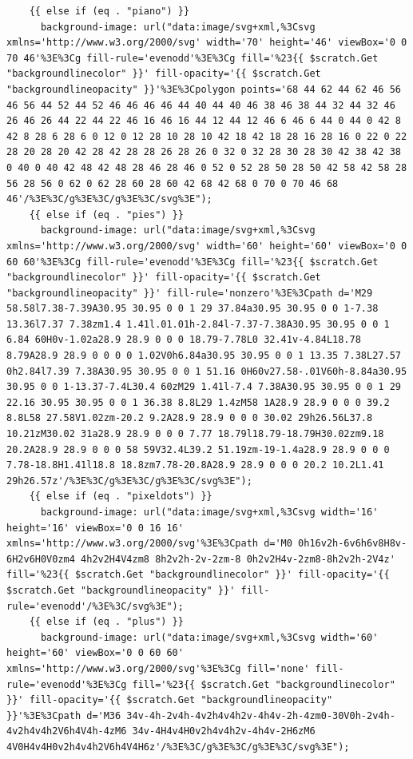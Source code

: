 \documentclass[11pt]{article}
\begin{document}
\begin{enumerate}
\begin{verbatim}
    {{ else if (eq . "piano") }}
      background-image: url("data:image/svg+xml,%3Csvg xmlns='http://www.w3.org/2000/svg' width='70' height='46' viewBox='0 0 70 46'%3E%3Cg fill-rule='evenodd'%3E%3Cg fill='%23{{ $scratch.Get "backgroundlinecolor" }}' fill-opacity='{{ $scratch.Get "backgroundlineopacity" }}'%3E%3Cpolygon points='68 44 62 44 62 46 56 46 56 44 52 44 52 46 46 46 46 44 40 44 40 46 38 46 38 44 32 44 32 46 26 46 26 44 22 44 22 46 16 46 16 44 12 44 12 46 6 46 6 44 0 44 0 42 8 42 8 28 6 28 6 0 12 0 12 28 10 28 10 42 18 42 18 28 16 28 16 0 22 0 22 28 20 28 20 42 28 42 28 28 26 28 26 0 32 0 32 28 30 28 30 42 38 42 38 0 40 0 40 42 48 42 48 28 46 28 46 0 52 0 52 28 50 28 50 42 58 42 58 28 56 28 56 0 62 0 62 28 60 28 60 42 68 42 68 0 70 0 70 46 68 46'/%3E%3C/g%3E%3C/g%3E%3C/svg%3E");
    {{ else if (eq . "pies") }}
      background-image: url("data:image/svg+xml,%3Csvg xmlns='http://www.w3.org/2000/svg' width='60' height='60' viewBox='0 0 60 60'%3E%3Cg fill-rule='evenodd'%3E%3Cg fill='%23{{ $scratch.Get "backgroundlinecolor" }}' fill-opacity='{{ $scratch.Get "backgroundlineopacity" }}' fill-rule='nonzero'%3E%3Cpath d='M29 58.58l7.38-7.39A30.95 30.95 0 0 1 29 37.84a30.95 30.95 0 0 1-7.38 13.36l7.37 7.38zm1.4 1.41l.01.01h-2.84l-7.37-7.38A30.95 30.95 0 0 1 6.84 60H0v-1.02a28.9 28.9 0 0 0 18.79-7.78L0 32.41v-4.84L18.78 8.79A28.9 28.9 0 0 0 0 1.02V0h6.84a30.95 30.95 0 0 1 13.35 7.38L27.57 0h2.84l7.39 7.38A30.95 30.95 0 0 1 51.16 0H60v27.58-.01V60h-8.84a30.95 30.95 0 0 1-13.37-7.4L30.4 60zM29 1.41l-7.4 7.38A30.95 30.95 0 0 1 29 22.16 30.95 30.95 0 0 1 36.38 8.8L29 1.4zM58 1A28.9 28.9 0 0 0 39.2 8.8L58 27.58V1.02zm-20.2 9.2A28.9 28.9 0 0 0 30.02 29h26.56L37.8 10.21zM30.02 31a28.9 28.9 0 0 0 7.77 18.79l18.79-18.79H30.02zm9.18 20.2A28.9 28.9 0 0 0 58 59V32.4L39.2 51.19zm-19-1.4a28.9 28.9 0 0 0 7.78-18.8H1.41l18.8 18.8zm7.78-20.8A28.9 28.9 0 0 0 20.2 10.2L1.41 29h26.57z'/%3E%3C/g%3E%3C/g%3E%3C/svg%3E");
    {{ else if (eq . "pixeldots") }}
      background-image: url("data:image/svg+xml,%3Csvg width='16' height='16' viewBox='0 0 16 16' xmlns='http://www.w3.org/2000/svg'%3E%3Cpath d='M0 0h16v2h-6v6h6v8H8v-6H2v6H0V0zm4 4h2v2H4V4zm8 8h2v2h-2v-2zm-8 0h2v2H4v-2zm8-8h2v2h-2V4z' fill='%23{{ $scratch.Get "backgroundlinecolor" }}' fill-opacity='{{ $scratch.Get "backgroundlineopacity" }}' fill-rule='evenodd'/%3E%3C/svg%3E");
    {{ else if (eq . "plus") }}
      background-image: url("data:image/svg+xml,%3Csvg width='60' height='60' viewBox='0 0 60 60' xmlns='http://www.w3.org/2000/svg'%3E%3Cg fill='none' fill-rule='evenodd'%3E%3Cg fill='%23{{ $scratch.Get "backgroundlinecolor" }}' fill-opacity='{{ $scratch.Get "backgroundlineopacity" }}'%3E%3Cpath d='M36 34v-4h-2v4h-4v2h4v4h2v-4h4v-2h-4zm0-30V0h-2v4h-4v2h4v4h2V6h4V4h-4zM6 34v-4H4v4H0v2h4v4h2v-4h4v-2H6zM6 4V0H4v4H0v2h4v4h2V6h4V4H6z'/%3E%3C/g%3E%3C/g%3E%3C/svg%3E");

\end{verbatim}
\end{enumerate}
\end{document}
